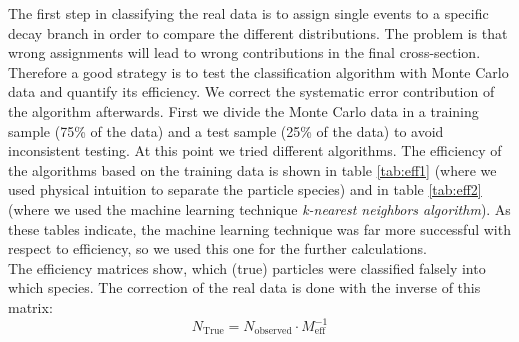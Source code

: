The first step in classifying the real data is to assign single events to a specific decay branch in order to
compare the different distributions. The problem is that wrong assignments will lead to wrong contributions 
in the final cross-section. Therefore a good strategy is to test the classification algorithm with Monte Carlo data and 
quantify its efficiency. We correct the systematic error contribution of the algorithm afterwards. First we 
divide the Monte Carlo data in a training sample (75\% of the data) and a test sample (25\% of the data) to avoid
inconsistent testing.  At this point we tried different algorithms. The efficiency of the algorithms based on the training
data is shown in table \ref{tab:eff1} (where we used physical intuition to separate the particle species) and in table
\ref{tab:eff2} (where we used the machine learning technique \textit{k-nearest neighbors algorithm}). As these tables indicate,
the machine learning technique was far more successful with respect to efficiency, so we used this one for the further 
calculations. \\
The efficiency matrices show, which (true) particles were classified falsely into which species. The correction
of the real data is done with the inverse of this matrix:
\begin{equation}
    \label{eq:eff_inverse}
    N_{\mathrm{True}} = N_{ \mathrm{observed}} \cdot M_{\mathrm{eff}}^{-1}
\end{equation}


